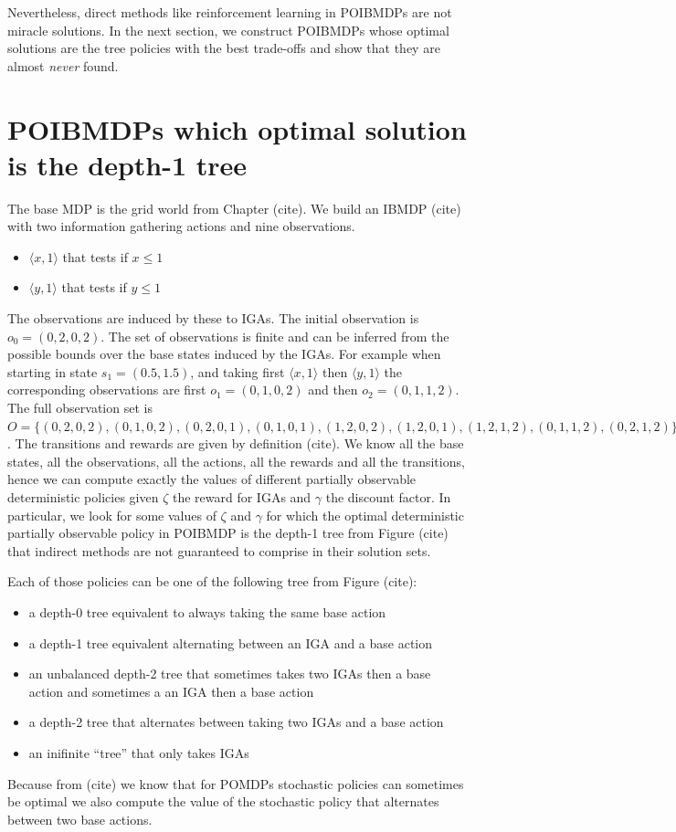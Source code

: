 Nevertheless, direct methods like reinforcement learning in POIBMDPs are not miracle solutions. In the next section, we construct POIBMDPs whose optimal solutions are the tree policies with the best trade-offs and show that they are almost \textit{never} found.

\section{POIBMDPs which optimal solution is the depth-1 tree}
The base MDP is the grid world from Chapter (cite). We build an IBMDP (cite) with two information gathering actions and nine observations.
\begin{itemize}
    \item $\langle x, 1\rangle$ that tests if $x\leq 1$
    \item $\langle y, 1\rangle$ that tests if $y\leq 1$
\end{itemize}
The observations are induced by these to IGAs. The initial observation is $o_0=(0, 2, 0, 2)$.
The set of observations is finite and can be inferred from the possible bounds over the base states induced by the IGAs.
For example when starting in state $s_1 = (0.5, 1.5)$, and taking first $\langle x, 1\rangle$ then $\langle y, 1\rangle$ the corresponding observations are first $o_1 = (0, 1, 0, 2)$ and then $o_2 = (0, 1, 1, 2)$.
The full observation set is $O = \{(0, 2, 0, 2), (0, 1, 0, 2), (0, 2, 0, 1), (0, 1, 0, 1), (1, 2, 0, 2), (1, 2, 0, 1), (1, 2, 1, 2), (0, 1, 1, 2), (0, 2, 1, 2)\}$.
The transitions and rewards are given by definition (cite).
We know all the base states, all the observations, all the actions, all the rewards and all the transitions, hence we can compute exactly the values of different partially observable deterministic policies given $\zeta$ the reward for IGAs and $\gamma$ the discount factor.
In particular, we look for some values of $\zeta$ and $\gamma$ for which the optimal deterministic partially observable policy in POIBMDP is the depth-1 tree from Figure (cite) that indirect methods are not guaranteed to comprise in their solution sets.

Each of those policies can be one of the following tree from Figure (cite): 
\begin{itemize}
    \item a depth-0 tree equivalent to always taking the same base action 
    \item a depth-1 tree equivalent alternating between an IGA and a base action 
    \item an unbalanced depth-2 tree that sometimes takes two IGAs then a base action and sometimes a an IGA then a base action
    \item a depth-2 tree that alternates between taking two IGAs and a base action
    \item an inifinite ``tree'' that only takes IGAs
\end{itemize}
Because from (cite) we know that for POMDPs stochastic policies can sometimes be optimal we also compute the value of the stochastic policy that alternates between two base actions.

